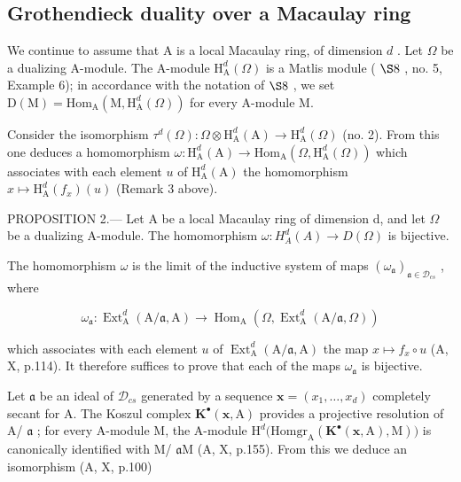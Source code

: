 \subsection{Grothendieck duality over a Macaulay ring}

We continue to assume that A is a local Macaulay ring, of dimension \(d\) . Let \(\Omega\) be a dualizing A-module. The A-module \(\mathrm{H}_{\mathrm{A}}^{d}(\Omega)\) is a Matlis module ( \(\S 8\) , no. 5, Example 6); in accordance with the notation of \(\S 8\) , we set \(\mathrm{D(M)} = \mathrm{Hom}_{\mathrm{A}}(\mathrm{M}, \mathrm{H}_{\mathrm{A}}^{d}(\Omega))\) for every A-module M.

Consider the isomorphism \(\tau^{d}(\Omega):\Omega\otimes\mathrm{H}_{\mathrm{A}}^{d}(\mathrm{A})\to\mathrm{H}_{\mathrm{A}}^{d}(\Omega)\) (no. 2). From this one deduces a homomorphism \(\omega:\mathrm{H}_{\mathrm{A}}^{d}(\mathrm{A})\to\mathrm{Hom}_{\mathrm{A}}(\Omega,\mathrm{H}_{\mathrm{A}}^{d}(\Omega))\) which associates with each element \(u\) of \(\mathrm{H}_{\mathrm{A}}^{d}(\mathrm{A})\) the homomorphism \(x\mapsto\mathrm{H}_{\mathrm{A}}^{d}(f_{x})(u)\) (Remark 3 above).

PROPOSITION 2.--- Let A be a local Macaulay ring of dimension d, and let \(\Omega\) be a dualizing A-module. The homomorphism \(\omega: H_{A}^{d}(A) \to D(\Omega)\) is bijective.

The homomorphism \(\omega\) is the limit of the inductive system of maps \((\omega_{\mathfrak{a}})_{\mathfrak{a}\in\mathcal{D}_{cs}}\) , where

\[
\omega_ {\mathfrak {a}}: \operatorname{Ext} _ {\mathrm{A}} ^ {d} (\mathrm{A} / \mathfrak {a}, \mathrm{A}) \longrightarrow \operatorname{Hom} _ {\mathrm{A}} (\Omega , \operatorname{Ext} _ {\mathrm{A}} ^ {d} (\mathrm{A} / \mathfrak {a}, \Omega))
\]

which associates with each element \(u\) of \(\operatorname{Ext}_{\mathrm{A}}^{d}(\mathrm{A}/\mathfrak{a},\mathrm{A})\) the map \(x\mapsto f_{x}\circ u\) (A, X, p.114). It therefore suffices to prove that each of the maps \(\omega_{\mathfrak{a}}\) is bijective.

Let \(\mathfrak{a}\) be an ideal of \(\mathcal{D}_{cs}\) generated by a sequence \(\mathbf{x} = (x_1, \ldots, x_d)\) completely secant for A. The Koszul complex \(\mathbf{K}^{\bullet}(\mathbf{x}, \mathrm{A})\) provides a projective resolution of A/ \(\mathfrak{a}\) ; for every A-module M, the A-module \(\mathrm{H}^d\big(\mathrm{Homgr}_\mathrm{A}(\mathbf{K}^{\bullet}(\mathbf{x}, \mathrm{A}), \mathrm{M})\big)\) is canonically identified with M/ \(\mathfrak{a}\mathrm{M}\) (A, X, p.155). From this we deduce an isomorphism (A, X, p.100)

